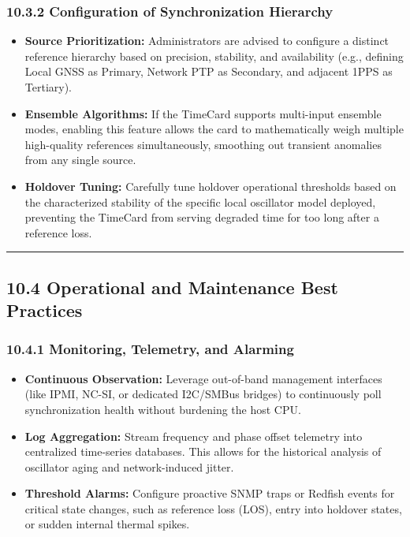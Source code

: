 \documentclass[
]{article}
\begin{document}
\subsubsection{10.3.2 Configuration of Synchronization
Hierarchy}\label{configuration-of-synchronization-hierarchy}

\begin{itemize}
\item
  \textbf{Source Prioritization:} Administrators are advised to
  configure a distinct reference hierarchy based on precision,
  stability, and availability (e.g., defining Local GNSS as Primary,
  Network PTP as Secondary, and adjacent 1PPS as Tertiary).
\item
  \textbf{Ensemble Algorithms:} If the TimeCard supports multi-input
  ensemble modes, enabling this feature allows the card to
  mathematically weigh multiple high-quality references simultaneously,
  smoothing out transient anomalies from any single source.
\item
  \textbf{Holdover Tuning:} Carefully tune holdover operational
  thresholds based on the characterized stability of the specific local
  oscillator model deployed, preventing the TimeCard from serving
  degraded time for too long after a reference loss.
\end{itemize}

\begin{center}\rule{0.5\linewidth}{0.5pt}\end{center}

\subsection{10.4 Operational and Maintenance Best
Practices}\label{operational-and-maintenance-best-practices}

\subsubsection{10.4.1 Monitoring, Telemetry, and
Alarming}\label{monitoring-telemetry-and-alarming}

\begin{itemize}
\item
  \textbf{Continuous Observation:} Leverage out-of-band management
  interfaces (like IPMI, NC-SI, or dedicated I2C/SMBus bridges) to
  continuously poll synchronization health without burdening the host
  CPU.
\item
  \textbf{Log Aggregation:} Stream frequency and phase offset telemetry
  into centralized time-series databases. This allows for the historical
  analysis of oscillator aging and network-induced jitter.
\item
  \textbf{Threshold Alarms:} Configure proactive SNMP traps or Redfish
  events for critical state changes, such as reference loss (LOS), entry
  into holdover states, or sudden internal thermal spikes.
\end{itemize}
\end{document}
